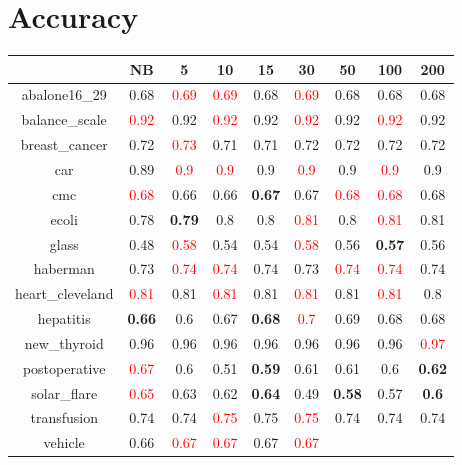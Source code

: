 \documentclass{article}%
\begin{document}
%
\normalsize%
\section*{Accuracy}%
\begin{tabular}{c|cccccccc}%
\hline%
&NB&5&10&15&30&50&100&200\\%
\hline%
abalone16\_29&0.68&\textcolor{red}{ 
0.69
}&\textcolor{red}{ 
0.69
}&0.68&\textcolor{red}{ 
0.69
}&0.68&0.68&0.68\\%
\hline%
balance\_scale&\textcolor{red}{ 
0.92
}&0.92&\textcolor{red}{ 
0.92
}&0.92&\textcolor{red}{ 
0.92
}&0.92&\textcolor{red}{ 
0.92
}&0.92\\%
\hline%
breast\_cancer&0.72&\textcolor{red}{ 
0.73
}&0.71&0.71&0.72&0.72&0.72&0.72\\%
\hline%
car&0.89&\textcolor{red}{ 
0.9
}&\textcolor{red}{ 
0.9
}&0.9&\textcolor{red}{ 
0.9
}&0.9&\textcolor{red}{ 
0.9
}&0.9\\%
\hline%
cmc&\textcolor{red}{ 
0.68
}&0.66&0.66&\textbf{0.67}&0.67&\textcolor{red}{ 
0.68
}&\textcolor{red}{ 
0.68
}&0.68\\%
\hline%
ecoli&0.78&\textbf{0.79}&0.8&0.8&\textcolor{red}{ 
0.81
}&0.8&\textcolor{red}{ 
0.81
}&0.81\\%
\hline%
glass&0.48&\textcolor{red}{ 
0.58
}&0.54&0.54&\textcolor{red}{ 
0.58
}&0.56&\textbf{0.57}&0.56\\%
\hline%
haberman&0.73&\textcolor{red}{ 
0.74
}&\textcolor{red}{ 
0.74
}&0.74&0.73&\textcolor{red}{ 
0.74
}&\textcolor{red}{ 
0.74
}&0.74\\%
\hline%
heart\_cleveland&\textcolor{red}{ 
0.81
}&0.81&\textcolor{red}{ 
0.81
}&0.81&\textcolor{red}{ 
0.81
}&0.81&\textcolor{red}{ 
0.81
}&0.8\\%
\hline%
hepatitis&\textbf{0.66}&0.6&0.67&\textbf{0.68}&\textcolor{red}{ 
0.7
}&0.69&0.68&0.68\\%
\hline%
new\_thyroid&0.96&0.96&0.96&0.96&0.96&0.96&0.96&\textcolor{red}{ 
0.97
}\\%
\hline%
postoperative&\textcolor{red}{ 
0.67
}&0.6&0.51&\textbf{0.59}&0.61&0.61&0.6&\textbf{0.62}\\%
\hline%
solar\_flare&\textcolor{red}{ 
0.65
}&0.63&0.62&\textbf{0.64}&0.49&\textbf{0.58}&0.57&\textbf{0.6}\\%
\hline%
transfusion&0.74&0.74&\textcolor{red}{ 
0.75
}&0.75&\textcolor{red}{ 
0.75
}&0.74&0.74&0.74\\%
\hline%
vehicle&0.66&\textcolor{red}{ 
0.67
}&\textcolor{red}{ 
0.67
}&0.67&\textcolor{red}{ 
0.67
}
\end{tabular}
\end{document}
